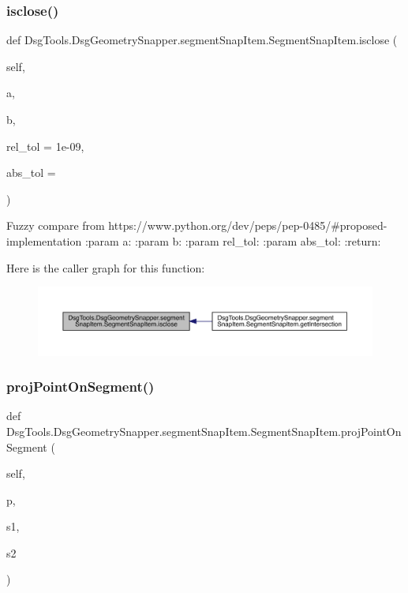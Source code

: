 \subsubsection{\texorpdfstring{isclose()}{isclose()}}
{\footnotesize\ttfamily def Dsg\+Tools.\+Dsg\+Geometry\+Snapper.\+segment\+Snap\+Item.\+Segment\+Snap\+Item.\+isclose (\begin{DoxyParamCaption}\item[{}]{self,  }\item[{}]{a,  }\item[{}]{b,  }\item[{}]{rel\+\_\+tol = {\ttfamily 1e-\/09},  }\item[{}]{abs\+\_\+tol = {} }\end{DoxyParamCaption})}

\begin{DoxyVerb}Fuzzy compare from https://www.python.org/dev/peps/pep-0485/#proposed-implementation
:param a:
:param b:
:param rel_tol:
:param abs_tol:
:return:
\end{DoxyVerb}
 Here is the caller graph for this function\+:
\nopagebreak
\begin{figure}[H]
\begin{center}
\leavevmode
\includegraphics[width=350pt]{class_dsg_tools_1_1_dsg_geometry_snapper_1_1segment_snap_item_1_1_segment_snap_item_a8b8442aedb680465b830ad45dff65aa2_icgraph}
\end{center}
\end{figure}
\mbox{\label{class_dsg_tools_1_1_dsg_geometry_snapper_1_1segment_snap_item_1_1_segment_snap_item_a0e1482462bb375b0e1c63b63353ecaee}} 
\subsubsection{\texorpdfstring{proj\+Point\+On\+Segment()}{projPointOnSegment()}}
{\footnotesize\ttfamily def Dsg\+Tools.\+Dsg\+Geometry\+Snapper.\+segment\+Snap\+Item.\+Segment\+Snap\+Item.\+proj\+Point\+On\+Segment (\begin{DoxyParamCaption}\item[{}]{self,  }\item[{}]{p,  }\item[{}]{s1,  }\item[{}]{s2 }\end{DoxyParamCaption})}

